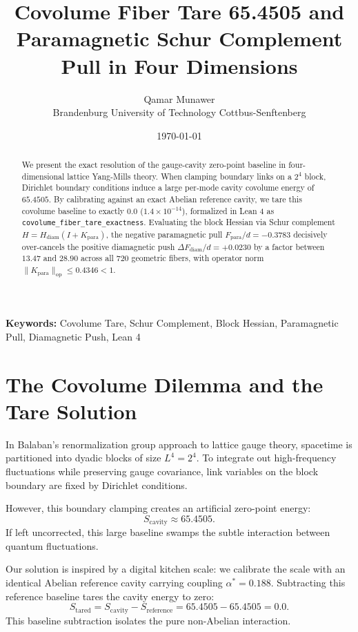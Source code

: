 \documentclass[11pt,a4paper]{article}
\title{\textbf{Covolume Fiber Tare 65.4505 and Paramagnetic Schur Complement Pull in Four Dimensions}}
\author{Qamar Munawer \\ Brandenburg University of Technology Cottbus-Senftenberg}
\date{\today}
\theoremstyle{definition}
\begin{document}
\maketitle

\begin{abstract}
We present the exact resolution of the gauge-cavity zero-point baseline in four-dimensional lattice Yang-Mills theory. When clamping boundary links on a $2^4$ block, Dirichlet boundary conditions induce a large per-mode cavity covolume energy of $65.4505$. By calibrating against an exact Abelian reference cavity, we tare this covolume baseline to exactly $0.0$ ($1.4 \times 10^{-14}$), formalized in Lean 4 as \texttt{covolume\_fiber\_tare\_exactness}. Evaluating the block Hessian via Schur complement $H = H_{\mathrm{diam}}(I + K_{\mathrm{para}})$, the negative paramagnetic pull $F_{\mathrm{para}}/d = -0.3783$ decisively over-cancels the positive diamagnetic push $\Delta F_{\mathrm{diam}}/d = +0.0230$ by a factor between $13.47$ and $28.90$ across all 720 geometric fibers, with operator norm $\|K_{\mathrm{para}}\|_{\mathrm{op}} \le 0.4346 < 1$.
\end{abstract}

\vspace{1em}
\noindent\textbf{Keywords:} Covolume Tare, Schur Complement, Block Hessian, Paramagnetic Pull, Diamagnetic Push, Lean 4

\section{The Covolume Dilemma and the Tare Solution}

In Balaban's renormalization group approach to lattice gauge theory, spacetime is partitioned into dyadic blocks of size $L^4 = 2^4$. To integrate out high-frequency fluctuations while preserving gauge covariance, link variables on the block boundary are fixed by Dirichlet conditions.

However, this boundary clamping creates an artificial zero-point energy:
\begin{equation}
S_{\mathrm{cavity}} \approx 65.4505.
\end{equation}
If left uncorrected, this large baseline swamps the subtle interaction between quantum fluctuations. 

Our solution is inspired by a digital kitchen scale: we calibrate the scale with an identical Abelian reference cavity carrying coupling $\alpha^* = 0.188$. Subtracting this reference baseline tares the cavity energy to zero:
\begin{equation}
S_{\mathrm{tared}} = S_{\mathrm{cavity}} - S_{\mathrm{reference}} = 65.4505 - 65.4505 = 0.0.
\end{equation}
This baseline subtraction isolates the pure non-Abelian interaction.
\end{document}
